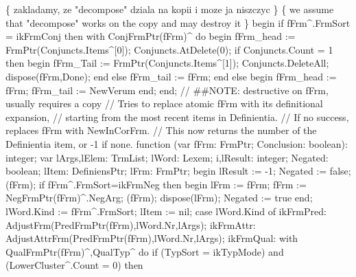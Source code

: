 \{ zakladamy, ze "decompose" dziala na kopii i moze ja niszczyc \}
\{ we assume that "decompose" works on the copy and may destroy it \}
begin
   if fFrm^.FrmSort = ikFrmConj then
      with ConjFrmPtr(fFrm)^ do
   begin
      fFrm_head := FrmPtr(Conjuncts.Items^[0]);
      Conjuncts.AtDelete(0);
      if Conjuncts.Count = 1 then
      begin fFrm_Tail := FrmPtr(Conjuncts.Items^[1]);
      Conjuncts.DeleteAll; dispose(fFrm,Done);
      end
      else fFrm_tail := fFrm;
   end
   else begin fFrm_head := fFrm; fFrm_tail := NewVerum end;
end;
\eatline
{}\nwendcode{}\nwdocspar
\nwenddocs{}\endmoddef\nwstartdeflinemarkup{}\nwenddeflinemarkup
// ##NOTE: destructive on fFrm, usually requires a copy
// Tries to replace atomic fFrm with its definitional expansion,
// starting from the most recent items in Definientia.
// If no success, replaces fFrm with NewInCorFrm.
// This now returns the number of the Definientia item, or -1 if none.
function (var fFrm: FrmPtr; Conclusion: boolean): integer;
var
   lArgs,lElem: TrmList;
   lWord: Lexem;
   i,lResult: integer;
   Negated: boolean;
   lItem: DefiniensPtr;
   lFrm: FrmPtr;
begin
   lResult :=  -1;
   Negated := false;
   (fFrm);
   if fFrm^.FrmSort=ikFrmNeg then
   begin
      lFrm := fFrm;
      fFrm := NegFrmPtr(fFrm)^.NegArg;
      (fFrm);
      dispose(lFrm);
      Negated := true
   end;
   lWord.Kind := fFrm^.FrmSort;
   lItem := nil;
   case lWord.Kind of
      ikFrmPred: AdjustFrm(PredFrmPtr(fFrm),lWord.Nr,lArgs);
      ikFrmAttr: AdjustAttrFrm(PredFrmPtr(fFrm),lWord.Nr,lArgs);
      ikFrmQual:
         with QualFrmPtr(fFrm)^,QualTyp^ do
         if (TypSort = ikTypMode) and (LowerCluster^.Count = 0) then
